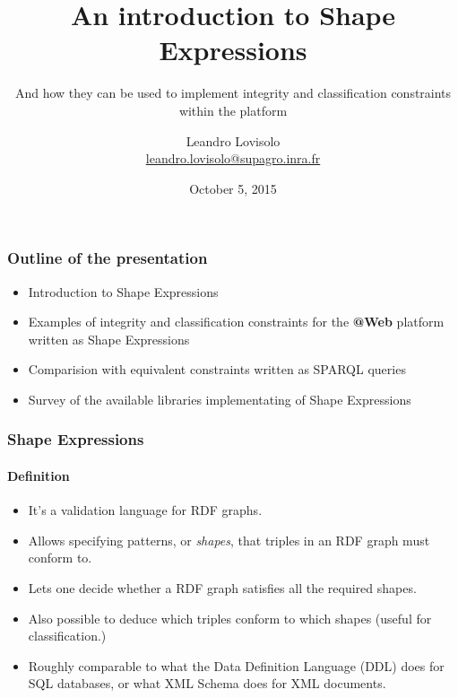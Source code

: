 \documentclass{beamer}
\title{An introduction to Shape Expressions}
\subtitle{
  And how they can be used to implement integrity and classification constraints
  within the \atweb platform
}
\author{
  Leandro Lovisolo \\
  \footnotesize{\href{mailto:leandro.lovisolo@supagro.inra.fr}
                     {leandro.lovisolo@supagro.inra.fr}}
}
\date{October 5, 2015}
\institute{
  INRA SupAgro and INRIA GraphiK \\
  Montpellier, France
}
\makeatletter
\newcommand{\atweb}{\textbf{@Web}\xspace}
\makeatother
\begin{document}
\begin{frame}
  \titlepage
\end{frame}

\begin{frame}
  \frametitle{Outline of the presentation}

  \begin{itemize}
    \item Introduction to Shape Expressions
    \item Examples of integrity and classification constraints for the \atweb
      platform written as Shape Expressions
    \item Comparision with equivalent constraints written as SPARQL queries
    \item Survey of the available libraries implementating of Shape Expressions
  \end{itemize}
\end{frame}

\begin{frame}
  \frametitle{Shape Expressions}
  \framesubtitle{Definition}

  \begin{itemize}
    \item It's a validation language for RDF graphs.

    \pause

    \item Allows specifying patterns, or \textit{shapes}, that triples in an
      RDF graph must conform to.

    \pause

    \item Lets one decide whether a RDF graph satisfies all the required shapes.

    \pause

    \item Also possible to deduce which triples conform to which shapes (useful
      for classification.)

    \pause

    \item Roughly comparable to what the Data Definition Language (DDL) does
      for SQL databases, or what XML Schema does for XML documents.
  \end{itemize}
\end{frame}
\end{document}
